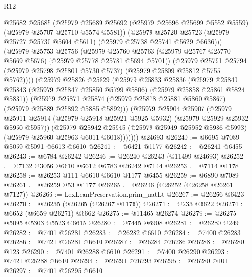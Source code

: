 \begin{lexlean}{R12}
\begin{coremodule}
{{{{{{{{{{{{{{{{{{{{{{{{{{{{{{{{{{{{{{{{{{{{{{{{{{{{{{{{{{{{{{{{{{{{{{{{{{{{{{{{{{              @25682
              @25685
              (@25979
                @25689
                @25692
                (@25979 @25696 @25699 @5552 @5559)
                (@25979 @25707 @25710 @5574 @5581))
              (@25979
                @25720
                @25723
                (@25979 @25727 @25730 @5604 @5611)
                (@25979 @25738 @25741 @5629 @5636)))
            (@25979
              @25753
              @25756
              (@25979
                @25760
                @25763
                (@25979 @25767 @25770 @5669 @5676)
                (@25979 @25778 @25781 @5694 @5701))
              (@25979
                @25791
                @25794
                (@25979 @25798 @25801 @5730 @5737)
                (@25979 @25809 @25812 @5755 @5762))))
          (@25979
            @25826
            @25829
            (@25979
              @25833
              @25836
              (@25979
                @25840
                @25843
                (@25979 @25847 @25850 @5799 @5806)
                (@25979 @25858 @25861 @5824 @5831))
              (@25979
                @25871
                @25874
                (@25979 @25878 @25881 @5860 @5867)
                (@25979 @25889 @25892 @5885 @5892)))
            (@25979
              @25904
              @25907
              (@25979
                @25911
                @25914
                (@25979 @25918 @25921 @5925 @5932)
                (@25979 @25929 @25932 @5950 @5957))
              (@25979
                @25942
                @25945
                (@25979 @25949 @25952 @5986 @5993)
                (@25979 @25960 @25963 @6011 @6018)))))))
    @24693
@26240 := @6695 @7089 @5059 @5091 @6613 @6610
@26241 := @6421 @1177
@26242 := @26241 @6455
@26243 := @6784 @26242
@26246 := @26240 @26243 (@11499 @24693)
@26252 := @7132 @3056 @6610 @6612 @6783 @26242 @7144
@26253 := @7114 @1178
@26258 := @26253 @111 @6610 @6610 @1177 @6455
@26259 := @6890 @7089
@26261 := @26259 @53 @1177
@26265 := @26246 (@26252 (@26258 @26261 @7127))
@26266 := LexLeanPreservation.prim_natLt
@26267 := @26266 @6423
@26270 := @26235 (@26265 (@26267 @1176))
@26271 := @233 @6622
@26274 := @6652 (@6659 @26271) @6662
@26275 := @11465 @26274
@26279 := @26275 @5095 @5303 @5523 @6615
@26280 := @7445 @6908
@26281 := @26280 @249
@26282 := @7401 @26281
@26283 := @26282 @6610
@26284 := @7400 @26283
@26286 := @7421 @26281 @6610
@26287 := @26284 @26286
@26288 := @26280 @123
@26290 := @7401 @26288 @6610
@26291 := @7400 @26290
@26293 := @7421 @26288 @6610
@26294 := @26291 @26293
@26295 := @26280 @101
@26297 := @7401 @26295 @6610
}}}}}}}}}}}}}}}}}}}}}}}}}}}}}}}}}}}}}}}}}}}}}}}}}}}}}}}}}}}}}}}}}}}}}}}}}}}}}}}}}}
\end{coremodule}
\end{lexlean}
